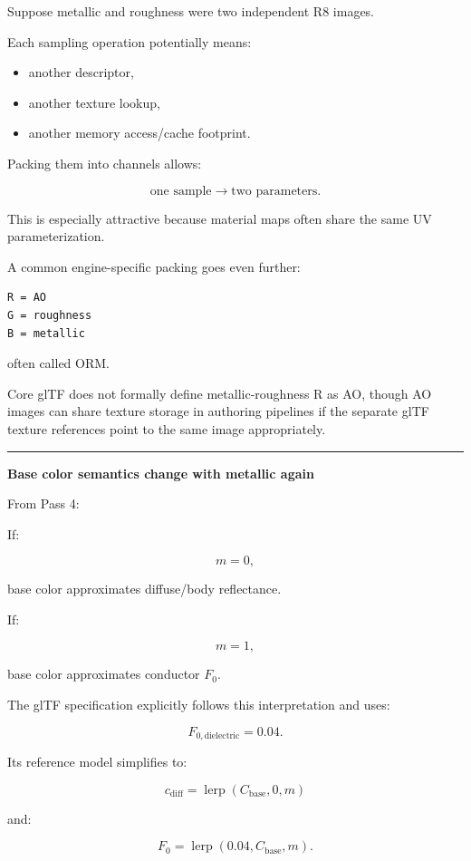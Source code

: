Suppose metallic and roughness were two independent R8 images.

Each sampling operation potentially means:

\begin{itemize}
\tightlist
\item
  another descriptor,
\item
  another texture lookup,
\item
  another memory access/cache footprint.
\end{itemize}

Packing them into channels allows:

\[
\text{one sample}
\rightarrow
\text{two parameters}.
\]

This is especially attractive because material maps often share the same UV parameterization.

A common engine-specific packing goes even further:

\begin{verbatim}
R = AO
G = roughness
B = metallic
\end{verbatim}

often called ORM.

Core glTF does not formally define metallic-roughness R as AO, though AO images can share texture storage in authoring pipelines if the separate glTF texture references point to the same image appropriately.

\begin{center}\rule{0.5\linewidth}{0.5pt}\end{center}

\textbf{Base color semantics change with metallic again}

From Pass 4:

If:

\[
m=0,
\]

base color approximates diffuse/body reflectance.

If:

\[
m=1,
\]

base color approximates conductor \(F_0\).

The glTF specification explicitly follows this interpretation and uses:

\[
F_{0,\text{dielectric}}=0.04.
\]

Its reference model simplifies to:

\[
c_{\text{diff}}
=
\operatorname{lerp}(C_{\text{base}},0,m)
\]

and:

\[
F_0=
\operatorname{lerp}(0.04,C_{\text{base}},m).
\]

